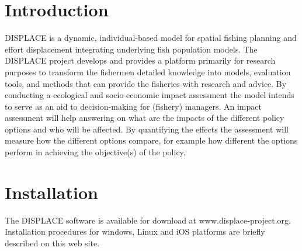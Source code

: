\hypertarget{index_intro_sec}{}\section{Introduction}\label{index_intro_sec}
D\+I\+S\+P\+L\+A\+CE is a dynamic, individual-\/based model for spatial fishing planning and effort displacement integrating underlying fish population models. The D\+I\+S\+P\+L\+A\+CE project develops and provides a platform primarily for research purposes to transform the fishermen detailed knowledge into models, evaluation tools, and methods that can provide the fisheries with research and advice. By conducting a ecological and socio-\/economic impact assessment the model intends to serve as an aid to decision-\/making for (fishery) managers. An impact assessment will help answering on what are the impacts of the different policy options and who will be affected. By quantifying the effects the assessment will measure how the different options compare, for example how different the options perform in achieving the objective(s) of the policy.\hypertarget{index_Installation}{}\section{Installation}\label{index_Installation}
The D\+I\+S\+P\+L\+A\+CE software is available for download at www.\+displace-\/project.\+org. Installation procedures for windows, Linux and i\+OS platforms are briefly described on this web site. 